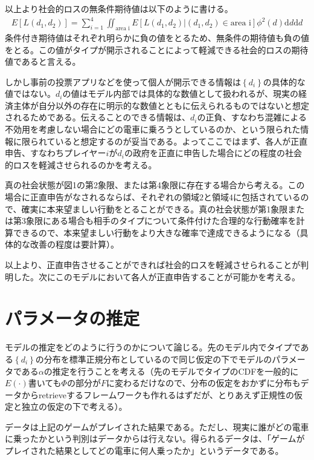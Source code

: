 \documentclass{jsarticle}
\begin{document}
以上より社会的ロスの無条件期待値は以下のように書ける。
\begin{align*}
	E[L(d_1, d_2)] = \sum_{i = 1}^4 \iint_{\text{area i}} E[L(d_1, d_2) | (d_1, d_2) \in \text{area i}] \phi^2(d) \mathrm{d}d \mathrm{d}d
\end{align*}
条件付き期待値はそれぞれ明らかに負の値をとるため、無条件の期待値も負の値をとる。この値がタイプが開示されることによって軽減できる社会的ロスの期待値であると言える。

しかし事前の投票アプリなどを使って個人が開示できる情報は$\left\{ d_i\right\}$の具体的な値ではない。$d_i$の値はモデル内部では具体的な数値として扱われるが、現実の経済主体が自分以外の存在に明示的な数値とともに伝えられるものではないと想定されるためである。伝えることのできる情報は、$d_i$の正負、すなわち混雑による不効用を考慮しない場合にどの電車に乗ろうとしているのか、という限られた情報に限られていると想定するのが妥当である。よってここではまず、各人が正直申告、すなわちプレイヤー$i$が$d_i$の政府を正直に申告した場合にどの程度の社会的ロスを軽減させられるのかを考える。

真の社会状態が図1の第2象限、または第4象限に存在する場合から考える。この場合に正直申告がなされるならば、それぞれの領域$2$と領域$4$に包括されているので、確実に本来望ましい行動をとることができる。真の社会状態が第1象限または第3象限にある場合も相手のタイプについて条件付けた合理的な行動確率を計算できるので、本来望ましい行動をより大きな確率で達成できるようになる（具体的な改善の程度は要計算）。

以上より、正直申告させることができれば社会的ロスを軽減させられることが判明した。次にこのモデルにおいて各人が正直申告することが可能かを考える。

\section{パラメータの推定}
モデルの推定をどのように行うのかについて論じる。先のモデル内でタイプである$\left\{ d_i \right\}$の分布を標準正規分布としているので同じ仮定の下でモデルのパラメータである$\alpha$の推定を行うことを考える（先のモデルでタイプのCDFを一般的に$E(\cdot)$書いても$\Phi$の部分が$F$に変わるだけなので、分布の仮定をおかずに分布もデータからretrieveするフレームワークも作れるはずだが、とりあえず正規性の仮定と独立の仮定の下で考える）。

データは上記のゲームがプレイされた結果である。ただし、現実に誰がどの電車に乗ったかという判別はデータからは行えない。得られるデータは、「ゲームがプレイされた結果としてどの電車に何人乗ったか」というデータである。
\end{document}
